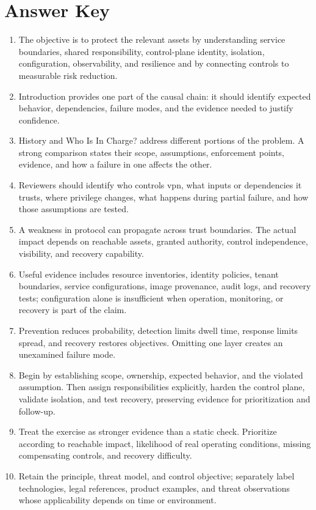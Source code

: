 \documentclass[11pt,letterpaper]{article}
\begin{document}
\section*{Answer Key}
\begin{enumerate}
\item The objective is to protect the relevant assets by understanding service boundaries, shared responsibility, control-plane identity, isolation, configuration, observability, and resilience and by connecting controls to measurable risk reduction.
\item Introduction provides one part of the causal chain: it should identify expected behavior, dependencies, failure modes, and the evidence needed to justify confidence.
\item History and Who Is In Charge? address different portions of the problem. A strong comparison states their scope, assumptions, enforcement points, evidence, and how a failure in one affects the other.
\item Reviewers should identify who controls vpn, what inputs or dependencies it trusts, where privilege changes, what happens during partial failure, and how those assumptions are tested.
\item A weakness in protocol can propagate across trust boundaries. The actual impact depends on reachable assets, granted authority, control independence, visibility, and recovery capability.
\item Useful evidence includes resource inventories, identity policies, tenant boundaries, service configurations, image provenance, audit logs, and recovery tests; configuration alone is insufficient when operation, monitoring, or recovery is part of the claim.
\item Prevention reduces probability, detection limits dwell time, response limits spread, and recovery restores objectives. Omitting one layer creates an unexamined failure mode.
\item Begin by establishing scope, ownership, expected behavior, and the violated assumption. Then assign responsibilities explicitly, harden the control plane, validate isolation, and test recovery, preserving evidence for prioritization and follow-up.
\item Treat the exercise as stronger evidence than a static check. Prioritize according to reachable impact, likelihood of real operating conditions, missing compensating controls, and recovery difficulty.
\item Retain the principle, threat model, and control objective; separately label technologies, legal references, product examples, and threat observations whose applicability depends on time or environment.
\end{enumerate}
\end{document}
